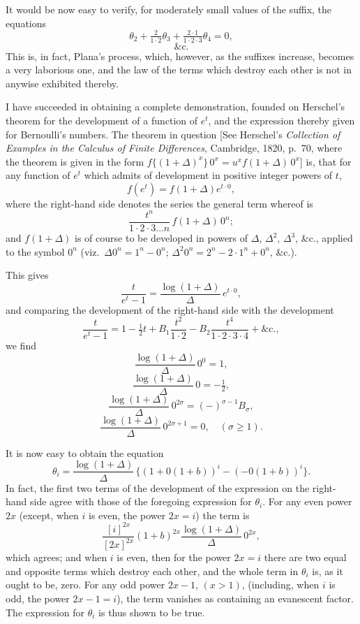 \documentclass[11pt,a4paper]{article}
\begin{document}
It would be now easy to verify, for moderately small values of the suffix, the equations
\[
\theta_{2} + \tfrac{2}{1 \cdot 2}\theta_{3} + \tfrac{2 \cdot 1}{1 \cdot 2 \cdot 3}\theta_{4} = 0,
\]
\[
\&\mathrm{c.}
\]
This is, in fact, Plana's process, which, however, as the suffixes increase, becomes a very laborious one, and the law of the terms which destroy each other is not in anywise exhibited thereby.

I have succeeded in obtaining a complete demonstration, founded on Herschel's theorem for the development of a function of $e^{t}$, and the expression thereby given for Bernoulli's numbers. The theorem in question [See Herschel's \textit{Collection of Examples in the Calculus of Finite Differences}, Cambridge, 1820, p.~70, where the theorem is given in the form $f\{(1 + \Delta)^{x}\}\, 0^{x} = u^{x} f(1 + \Delta)\, 0^{x}$] is, that for any function of $e^{t}$ which admits of development in positive integer powers of $t$,
\[
f(e^{t}) = f(1 + \Delta) e^{t \cdot 0},
\]
where the right-hand side denotes the series the general term whereof is
\[
\frac{t^{n}}{1 \cdot 2 \cdot 3 \ldots n}\, f(1 + \Delta)\, 0^{n};
\]
and $f(1 + \Delta)$ is of course to be developed in powers of $\Delta$, $\Delta^{2}$, $\Delta^{3}$, \&c., applied to the symbol $0^{n}$ (viz.\ $\Delta 0^{n} = 1^{n} - 0^{n}$; $\Delta^{2} 0^{n} = 2^{n} - 2 \cdot 1^{n} + 0^{n}$, \&c.).

This gives
\[
\frac{t}{e^{t} - 1} = \frac{\log(1 + \Delta)}{\Delta}\, e^{t \cdot 0},
\]
and comparing the development of the right-hand side with the development
\[
\frac{t}{e^{t} - 1} = 1 - \tfrac{1}{2}t + B_{1}\frac{t^{2}}{1 \cdot 2} - B_{2}\frac{t^{4}}{1 \cdot 2 \cdot 3 \cdot 4} + \&\mathrm{c.},
\]
we find
\[
\frac{\log(1 + \Delta)}{\Delta}\, 0^{0} = 1,
\]
\[
\frac{\log(1 + \Delta)}{\Delta}\, 0 = -\tfrac{1}{2},
\]
\[
\frac{\log(1 + \Delta)}{\Delta}\, 0^{2\sigma} = (-)^{\sigma - 1} B_{\sigma},
\]
\[
\frac{\log(1 + \Delta)}{\Delta}\, 0^{2\sigma + 1} = 0, \quad (\sigma \geq 1).
\]

\setcounter{page}{96}

It is now easy to obtain the equation
\[
\theta_{i} = \frac{\log(1 + \Delta)}{\Delta}\,\{(1 + 0(1+b))^{i} - (-0(1+b))^{i}\}.
\]
In fact, the first two terms of the development of the expression on the right-hand side agree with those of the foregoing expression for $\theta_{i}$. For any even power $2x$ (except, when $i$ is even, the power $2x = i$) the term is
\[
\frac{[i]^{2x}}{[2x]^{2x}}(1 + b)^{2x}\frac{\log(1 + \Delta)}{\Delta}\, 0^{2x},
\]
which agrees; and when $i$ is even, then for the power $2x = i$ there are two equal and opposite terms which destroy each other, and the whole term in $\theta_{i}$ is, as it ought to be, zero. For any odd power $2x - 1$, $(x > 1)$, (including, when $i$ is odd, the power $2x - 1 = i$), the term vanishes as containing an evanescent factor. The expression for $\theta_{i}$ is thus shown to be true.
\end{document}
